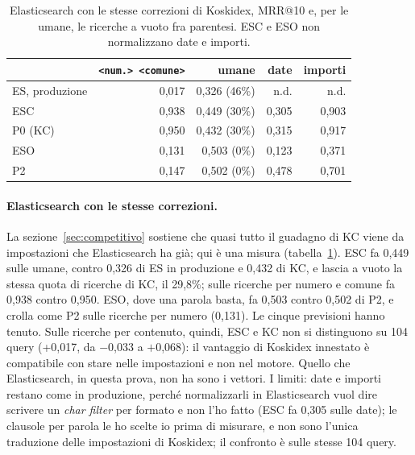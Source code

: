 

\begin{table}[ht]
  \centering
  \small
  \begin{tabular}{lrrrr}
    \toprule
    & \texttt{<num.> <comune>} & umane & date & importi \\
    \midrule
    ES, produzione & 0,017 & 0,326 (46\%) & n.d. & n.d. \\
    ESC & 0,938 & 0,449 (30\%) & 0,305 & 0,903 \\
    P0 (KC) & 0,950 & 0,432 (30\%) & 0,315 & 0,917 \\
    \midrule
    ESO & 0,131 & 0,503 (0\%) & 0,123 & 0,371 \\
    P2 & 0,147 & 0,502 (0\%) & 0,478 & 0,701 \\
    \bottomrule
  \end{tabular}
  \caption{Elasticsearch con le stesse correzioni di Koskidex, MRR@10 e, per le
  umane, le ricerche a vuoto fra parentesi. ESC e ESO non normalizzano date e
  importi.}
  \label{tab:es-corretto}
\end{table}

\paragraph{Elasticsearch con le stesse correzioni.} La sezione~\ref{sec:competitivo}
sostiene che quasi tutto il guadagno di KC viene da impostazioni che
Elasticsearch ha già; qui è una misura (tabella~\ref{tab:es-corretto}). ESC
fa 0,449 sulle umane, contro 0,326 di ES in produzione e 0,432 di KC, e lascia a
vuoto la stessa quota di ricerche di KC, il 29,8\%; sulle ricerche per numero e
comune fa 0,938 contro 0,950. ESO, dove una parola basta, fa 0,503 contro 0,502
di P2, e crolla come P2 sulle ricerche per numero (0,131). Le cinque
previsioni hanno tenuto. Sulle ricerche per contenuto, quindi, ESC e KC non si
distinguono su 104 query (+0,017, da $-$0,033 a $+$0,068): il vantaggio di
Koskidex innestato è compatibile con stare nelle impostazioni e non nel motore. Quello che
Elasticsearch, in questa prova, non ha sono i vettori. I limiti: date e importi
restano come in produzione, perché normalizzarli in Elasticsearch vuol dire
scrivere un \emph{char filter} per formato e non l'ho fatto (ESC fa 0,305 sulle
date); le clausole per parola le ho scelte io prima di misurare, e non sono
l'unica traduzione delle impostazioni di Koskidex; il confronto è sulle stesse
104 query.

